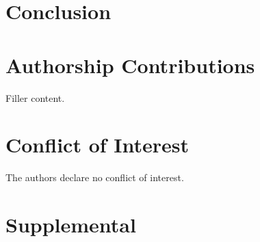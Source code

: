 \documentclass[preprint,11pt,fleqn]{elsarticle}
\begin{document}

\section{Conclusion}

\section*{Authorship Contributions}
Filler content.


\section*{Conflict of Interest}
\noindent The authors declare no conflict of interest.

\clearpage


\section*{\refname}
	
%	
	
\pagebreak 


\beginsupplement
\section{Supplemental}
\label{sec:Supplemental_text}

\end{document}
